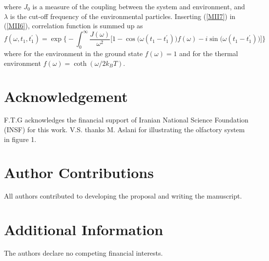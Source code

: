 \documentclass[aps,prl,tightenlines,onecolumn,superscriptaddress]{revtex4}
\begin{document}
where $J_{0}$ is a measure of the coupling between the system and environment, and $\lambda$ is the cut-off frequency of the environmental particles. Inserting (\ref{MII7}) in (\ref{MII6}), correlation function is summed up as
\begin{equation}\label{MII8}
f(\omega,t_{1},t^{\prime}_{1})=\exp\Big\{-\int_{0}^{\infty}\dfrac{J(\omega)}{\omega^{2}}\Big[1-\cos\big(\omega(t_{1}-t^{\prime}_{1})\big)f(\omega)
-i\sin\big(\omega(t_{1}-t^{\prime}_{1})\big)\Big]\Big\}
\end{equation}
where for the environment in the ground state $ f(\omega)=1$ and for the thermal environment $ f(\omega)=\coth(\omega/2k_{B}T)$.

\section{Acknowledgement}
F.T.G acknowledges the financial support of Iranian National Science Foundation (INSF) for this work. V.S. thanks M. Aslani for illustrating the olfactory system in figure 1.

\section{Author Contributions}
All authors contributed to developing the proposal and writing the manuscript.

\section{Additional Information}
The authors declare no competing financial interests.
\end{document}
